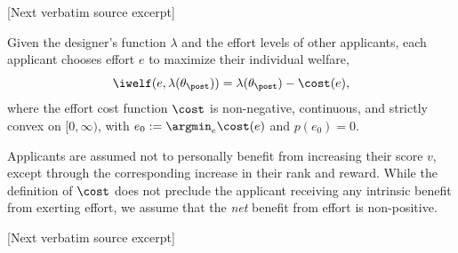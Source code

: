 \documentclass[10pt]{article}
\begin{document}
\begin{ReviewVerbatim}
{[Next verbatim source excerpt]

 Given the designer's function $\lambda$ and the effort levels of other applicants, each applicant chooses effort $e$ to maximize their individual welfare, %
\begin{equation*}
	\iwelf(e, \lambda(\theta_\post)) = \lambda(\theta_\post) - \cost(e),
\end{equation*}
where the effort cost function $\cost$ is non-negative, continuous, and strictly convex {on $[0,\infty)$, with $e_0:=\argmin_e \cost(e)$ and $p(e_0) = 0$.}

Applicants are assumed not to personally benefit from increasing their score $v$, except through the corresponding increase in their rank and reward. While the definition of $\cost$ does not preclude the applicant receiving any intrinsic benefit from exerting effort, we assume that the \emph{net} benefit from effort is non-positive.

[Next verbatim source excerpt]

}
\end{ReviewVerbatim}
\end{document}

